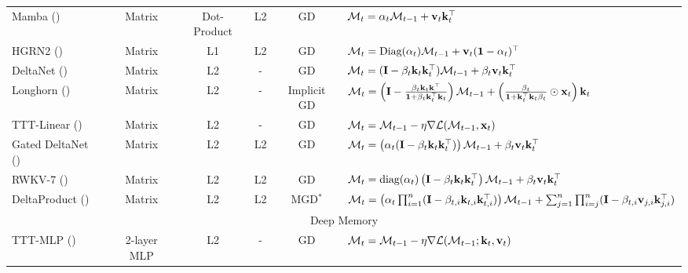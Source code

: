\begin{table}[t!]
{\begin{tabular}{l c c c c c c}
         Mamba (\citeyear{gu2024mamba})     & Matrix         & Dot-Product & L2 &  GD & \multicolumn{2}{l}{$\mathcal{M}_t =   \alpha_t \mathcal{M}_{t-1} + \mathbf{v}_t \mathbf{k}_t^\top $}\\
         HGRN2 (\citeyear{qin2024hgrn})      & Matrix  & L1 & L2 &  GD & \multicolumn{2}{l}{$\mathcal{M}_t =   \text{Diag}( \alpha_t) \mathcal{M}_{t-1}  +  \mathbf{v}_t(\mathbf{1} - \alpha_t)^\top $}\\
         DeltaNet (\citeyear{neil2017delta}) & Matrix         & L2 & - &  GD & \multicolumn{2}{l}{$\mathcal{M}_t =   (\mathbf{I} - \beta_t \mathbf{k}_t \mathbf{k}_t^\top) \mathcal{M}_{t-1} + \beta_t \mathbf{v}_t  \mathbf{k}_t^\top$}\\
         Longhorn (\citeyear{liu2024longhorn})  & Matrix         & L2 & - &  Implicit GD & \multicolumn{2}{l}{$\mathcal{M}_t =  \left(\mathbf{I}- \frac{\beta_t \mathbf{k}_t \mathbf{k}^\top}{\mathbf{1}+ \beta_t \mathbf{k}_t^\top \mathbf{k}_t} \right) \mathcal{M}_{t-1} + \left(\frac{\beta_t}{\mathbf{1}+ \mathbf{k}_t^\top \mathbf{k}_t \beta_t } \odot \mathbf{x}_t\right) \mathbf{k}_t$}\\
         TTT-Linear (\citeyear{sun2024learning}) & Matrix         & L2 & - &  GD & \multicolumn{2}{l}{$\mathcal{M}_t = \mathcal{M}_{t-1} - \eta\nabla \mathcal{L}(\mathcal{M}_{t-1}, \mathbf{x}_t)$}\\
         Gated DeltaNet (\citeyear{yang2024gated}) & Matrix & L2 & L2 & GD & \multicolumn{2}{l}{$\mathcal{M}_t =   \left(\alpha_t (\mathbf{I} - \beta_t \mathbf{k}_t \mathbf{k}_t^\top)\right) \mathcal{M}_{t-1} + \beta_t \mathbf{v}_t  \mathbf{k}_t^\top$} \\
         RWKV-7 (\citeyear{peng2025rwkv7}) & Matrix & L2 & L2 & GD & \multicolumn{2}{l}{$\mathcal{M}_t = \text{diag}(\alpha_t)\left( \mathbf{I} - \beta_t \mathbf{k}_t \mathbf{k}_t^\top \right) \mathcal{M}_{t-1} + \beta_t \mathbf{v}_t  \mathbf{k}_t^\top$}\\
         DeltaProduct (\citeyear{siems2025deltaproduct}) & Matrix & L2 & L2 & MGD$^*$ & \multicolumn{2}{l}{$\mathcal{M}_t =   \left(\alpha_t \prod_{i = 1}^{n} (\mathbf{I} - \beta_{t, i} \mathbf{k}_{t, i} \mathbf{k}_{t, i}^\top)\right) \mathcal{M}_{t-1} + \sum_{j = 1}^{n} \prod_{i = j}^{n} (\mathbf{I} - \beta_{t, i} \mathbf{v}_{j, i} \mathbf{k}_{j, i}^\top)$}\\
         \midrule
         \multicolumn{7}{c}{Deep Memory}\\
         \midrule
         TTT-MLP (\citeyear{sun2024learning})    & 2-layer MLP & L2 & - &  GD & \multicolumn{2}{l}{$\mathcal{M}_t = \mathcal{M}_{t-1} -\eta \nabla \mathcal{L}(\mathcal{M}_{t-1}; \mathbf{k}_t, \mathbf{v}_t)$}\\

\end{tabular}}
\end{table}
